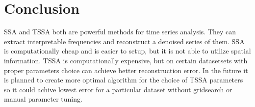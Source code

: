 \documentclass{article}
\begin{document}
% 
% 

\section{Conclusion}

SSA and TSSA both are powerful methods for time series analysis. They can extract interpretable frequencies and reconstruct a denoised series of them. SSA is computationally cheap and is easier to setup, but it is not able to utilize spatial information. TSSA is computationally expensive, but on certain datasetsets with proper parameters choice can achieve better reconstruction error. In the future it is planned to create more optimal algorithm for the choice of TSSA parameters so it could achive lowest error for a particular dataset without gridsearch or manual parameter tuning.

\nocite{*}


\end{document}

